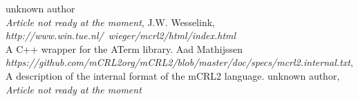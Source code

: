 \index{}\documentclass[a4paper,10pt]{article}
\theoremstyle{plain}
\theoremstyle{definition}
\begin{document}
\newpage
\begin{thebibliography}{99}
    unknown author \\
     \textit{Article not ready at the moment},
    J.W. Wesselink,
   \textit{http://www.win.tue.nl/~wieger/mcrl2/html/index.html}\\
   A C++ wrapper for the ATerm library.
    Aad Mathijssen\\
   \textit{https://github.com/mCRL2org/mCRL2/blob/master/doc/specs/mcrl2.internal.txt},
   A description of the internal format of the mCRL2 language.
   unknown author,
   \textit{Article not ready at the moment}

\end{thebibliography}

\newpage
\end{document}
